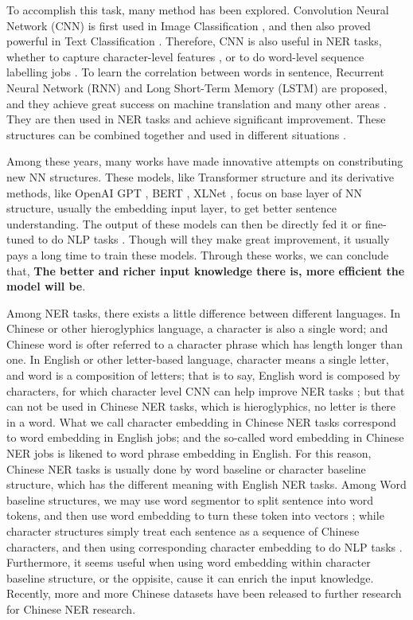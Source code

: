 \documentclass[letterpaper]{article} %
\begin{document}
To accomplish this task, many method has been explored.  Convolution Neural Network (CNN) is first used in Image Classification \cite{cnn}, and then also proved powerful in Text Classification \cite{kim}. Therefore, CNN is also useful in NER tasks, whether to capture character-level features \cite{char-fea1,mahovy,peter2017}, or to do word-level sequence labelling jobs \cite{santos,strubell}. To learn the correlation between words in sentence, Recurrent Neural Network (RNN) \cite{rnn} and Long Short-Term Memory (LSTM)  \cite{lstm} are proposed, and they achieve great success on machine translation and many other areas \cite{lstmbcp}. They are then used in NER tasks and achieve significant improvement. These structures can be combined together and used in different situations \cite{comb}.

Among these years, many works have made innovative attempts on constributing new NN structures. These models, like Transformer structure \cite{vaswani} and its derivative methods, like OpenAI GPT \cite{openai}, BERT \cite{bert}, XLNet \cite{xlnet}, focus on base layer of NN structure, usually the embedding input layer, to get better sentence understanding. The output of these models can then be directly fed it or fine-tuned to do NLP tasks \cite{bertslot}. Though will they make great improvement, it usually pays a long time to train these models. Through these works, we can conclude that, \textbf{The better and richer input knowledge there is, more efficient the model will be}. 

Among NER tasks, there exists a little difference between different languages. In Chinese or other hieroglyphics language, a character is also a single word; and Chinese word is ofter referred to a character phrase which has length longer than one. In English or other letter-based language, character means a single letter, and word is a composition of letters; that is to say, English word is composed by characters, for which character level CNN can help improve NER tasks \cite{huang15,char-fea1,mahovy,peter2017,peter2018,comb}; but that can not be used in Chinese NER tasks, which is hieroglyphics, no letter is there in a word. What we call character embedding in Chinese NER tasks correspond to word embedding in English jobs; and the so-called word embedding in Chinese NER jobs is likened to word phrase embedding in English. For this reason, Chinese NER tasks is usually done by word baseline or character baseline structure, which has the different meaning with English NER tasks. Among Word baseline structures, we may use word segmentor to split sentence into word tokens, and then use word embedding to turn these token into vectors \cite{peng15,peng16}; while character structures simply treat each sentence as a sequence of Chinese characters, and then using corresponding character embedding to do NLP tasks \cite{lattice,lrcnn}. Furthermore, it seems useful when using word embedding within character baseline structure, or the oppisite, cause it can enrich the input knowledge. Recently, more and more Chinese datasets \cite{msra,peng15,lattice} have been released to further research for Chinese NER research.  
\end{document}

